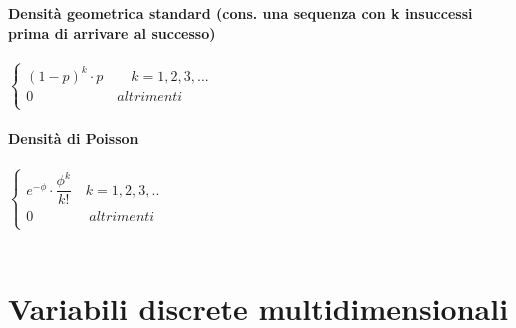\textbf{Densità geometrica standard (cons. una sequenza con k insuccessi prima di arrivare al successo)} \\ \\
$
\begin{cases}
	(1 - p)^{k} \cdot p\qquad  k = 1,2,3,... \\  
	0\qquad\qquad\qquad			 altrimenti \\
\end{cases}
$ \\ \\	

\textbf{Densità di Poisson} \\ \\
$
\begin{cases}
	e^{-\phi} \cdot \dfrac{\phi^{k}}{k!}\quad k = 1,2,3,.. \\
	0\qquad\quad\quad			 altrimenti \\
\end{cases}
$ \\ \\	

\section{Variabili discrete multidimensionali}